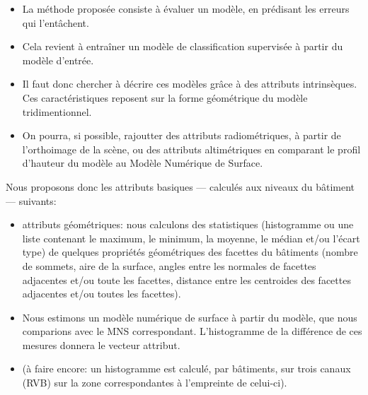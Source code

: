 \documentclass[a4paper,french]{article}
\begin{document}
    \begin{itemize}
        \item La méthode proposée consiste à évaluer un modèle, en prédisant les erreurs qui l'entâchent.
        \item  Cela revient à entraîner un modèle de classification supervisée à partir du modèle d'entrée.
        \item Il faut donc chercher à décrire ces modèles grâce à des attributs intrinsèques. Ces caractéristiques reposent sur la forme géométrique du modèle tridimentionnel.
        \item On pourra, si possible, rajoutter des attributs radiométriques, à partir de l'orthoimage de la scène, ou des attributs altimétriques en comparant le profil d'hauteur du modèle au Modèle Numérique de Surface.
    \end{itemize}

    Nous proposons donc les attributs basiques --- calculés aux niveaux du bâtiment --- suivants:
    \begin{itemize}
        \item attributs géométriques: nous calculons des statistiques (histogramme ou une liste contenant le maximum, le minimum, la moyenne, le médian et/ou l'écart type) de quelques propriétés géométriques des facettes du bâtiments (nombre de sommets, aire de la surface, angles entre les normales de facettes adjacentes et/ou toute les facettes, distance entre les centroides des facettes adjacentes et/ou toutes les facettes).
        \item Nous estimons un modèle numérique de surface à partir du modèle, que nous comparions avec le MNS correspondant. L'histogramme de la différence de ces mesures donnera le vecteur attribut.
        \item (à faire encore: un histogramme est calculé, par bâtiments, sur trois canaux (RVB) sur la zone correspondantes à l'empreinte de celui-ci).
    \end{itemize}
\end{document}
